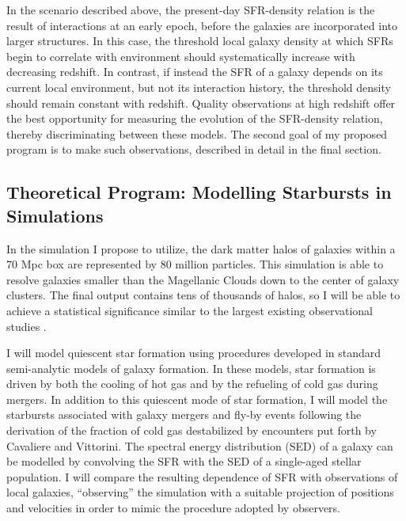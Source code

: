 \documentclass[12pt]{plan}
\begin{document}
In the scenario described above, the present-day SFR-density relation
is the result of interactions at an early epoch, before the galaxies are
incorporated into larger structures.  In this case, the threshold
local galaxy density at which SFRs begin to correlate with environment
should systematically increase with decreasing redshift.  In contrast,
if instead the SFR of a galaxy depends on its current local
environment, but not its interaction history, the threshold density
should remain constant with redshift.  Quality observations at high
redshift offer the best opportunity for measuring the evolution of the
SFR-density relation, thereby discriminating between these models.
The second goal of my proposed program is to make such observations, described
in detail in the final section.


\vspace{-3mm}
\subsection*{Theoretical Program:  Modelling Starbursts in Simulations}
\vspace{-2mm}
In the simulation I propose to utilize, the dark matter halos of galaxies within a 70
Mpc box are represented by 80 million particles\cite{Reed03}.  This simulation is
able to resolve galaxies smaller than the Magellanic Clouds down to
the center of galaxy clusters.  The final output contains tens of
thousands of halos, so I will be able to achieve a statistical
significance similar to the largest existing observational studies
\cite{Balogh03a}.

I will model quiescent star formation using procedures developed in
standard semi-analytic models of galaxy
formation\cite{Somerville99,Cole00,Menci02}.  In these models, star formation
is driven by both the cooling of hot gas and by the refueling of cold
gas during mergers.  In addition to this quiescent mode of star
formation, I will model the starbursts associated with galaxy mergers
and fly-by events following the derivation of the fraction of cold gas
destabilized by encounters put forth by Cavaliere and
Vittorini\cite{Cavaliere00,Menci03}.  The spectral energy distribution
(SED) of a galaxy can be modelled by convolving the SFR with the SED
of a single-aged stellar population\cite{Bruzual03}. I will compare the resulting
dependence of SFR with observations\cite{Lewis02,Gomez03,Balogh03a} of
local galaxies, ``observing'' the simulation with a suitable projection of positions and velocities in order to mimic the
procedure adopted by observers.
\end{document}
